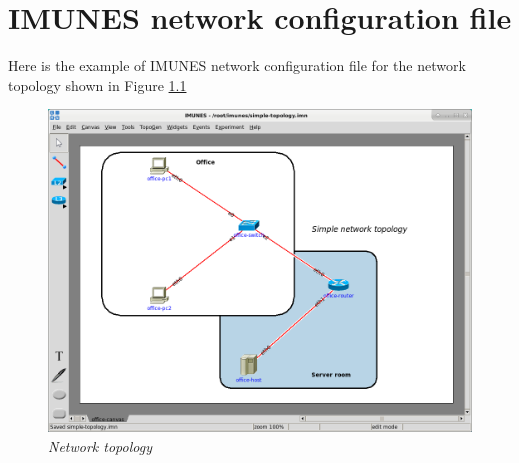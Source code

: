 \chapter{IMUNES network configuration file}
\label{sec:IMUNESNetworkConfigurationFile}
Here is the example of IMUNES network configuration file for the network
topology shown in Figure \ref{fig:network_topology} 

\begin{figure}[H]
\centering
\vspace{10pt}
\includegraphics[width=\textwidth]{./images/topology_example.png}
\caption{\emph{Network topology}}
\label{fig:network_topology}
\end{figure} 

